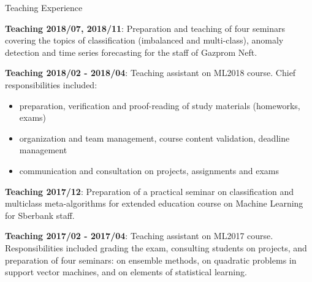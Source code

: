 \documentclass{resume} %
\begin{document}
\begin{rSection}{Teaching Experience}
    \medskip
    \item \textbf{Teaching 2018/07, 2018/11}:
    Preparation and teaching of four seminars covering the topics of classification
    (imbalanced and multi-class), anomaly detection and time series forecasting for
    the staff of Gazprom Neft.

    \medskip
    \item \textbf{Teaching 2018/02 - 2018/04}:
    Teaching assistant on ML2018 course. Chief responsibilities included:
    \begin{itemize}
        \item preparation, verification and proof-reading of study materials (homeworks, exams)
        
        \item organization and team management, course content validation, deadline management
        
        \item communication and consultation on projects, assignments and exams
    \end{itemize}

    \medskip
    \item \textbf{Teaching 2017/12}:
    Preparation of a practical seminar on classification and multiclass meta-algorithms
    for extended education course on Machine Learning for Sberbank staff.

    \medskip
    \item \textbf{Teaching 2017/02 - 2017/04}:
    Teaching assistant on ML2017 course. Responsibilities included grading the exam,
    consulting students on projects, and preparation of four seminars: on ensemble
    methods, on quadratic problems in support vector machines, and on elements of
    statistical learning.

\end{rSection}
\end{document}

